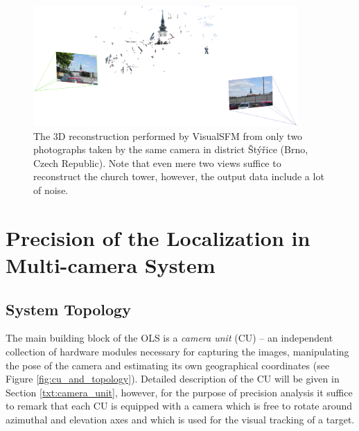 \begin{figure}[tbh]
	\centering
	\includegraphics[width=0.9\textwidth]{fig/visualsfm_tower.png}
	\caption{The 3D reconstruction performed by VisualSFM from only two photographs taken by the same camera in district Štýřice (Brno, Czech Republic). Note that even mere two views suffice to reconstruct the church tower, however, the output data include a lot of noise.}
	\label{fig:visualsfm_tower}
\end{figure}

\chapter{Precision of the Localization in Multi-camera System} \label{txt:precision_of_the_localization}

\vata[2]

\section{System Topology} \label{txt:system_topology}

The main building block of the OLS is a \textit{camera unit} (CU) -- an independent collection of hardware modules necessary for capturing the images, manipulating the pose of the camera and estimating its own geographical coordinates (see Figure \ref{fig:cu_and_topology}). Detailed description of the CU will be given in Section \ref{txt:camera_unit}, however, for the purpose of precision analysis it suffice to remark that each CU is equipped with a camera which is free to rotate around azimuthal and elevation axes and which is used for the visual tracking of a target.

